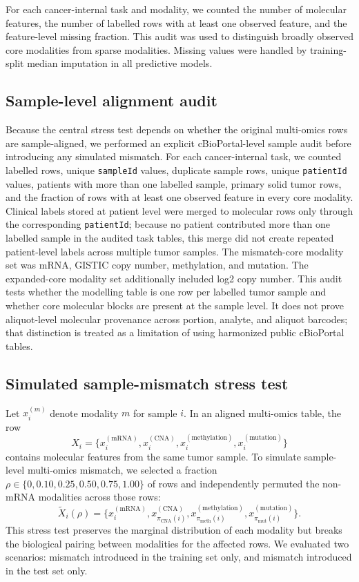 For each cancer-internal task and modality, we counted the number of molecular features, the number of labelled rows with at least one observed feature, and the feature-level missing fraction. This audit was used to distinguish broadly observed core modalities from sparse modalities. Missing values were handled by training-split median imputation in all predictive models.

\subsection{Sample-level alignment audit}

Because the central stress test depends on whether the original multi-omics rows are sample-aligned, we performed an explicit cBioPortal-level sample audit before introducing any simulated mismatch. For each cancer-internal task, we counted labelled rows, unique \texttt{sampleId} values, duplicate sample rows, unique \texttt{patientId} values, patients with more than one labelled sample, primary solid tumor rows, and the fraction of rows with at least one observed feature in every core modality. Clinical labels stored at patient level were merged to molecular rows only through the corresponding \texttt{patientId}; because no patient contributed more than one labelled sample in the audited task tables, this merge did not create repeated patient-level labels across multiple tumor samples. The mismatch-core modality set was mRNA, GISTIC copy number, methylation, and mutation. The expanded-core modality set additionally included log2 copy number. This audit tests whether the modelling table is one row per labelled tumor sample and whether core molecular blocks are present at the sample level. It does not prove aliquot-level molecular provenance across portion, analyte, and aliquot barcodes; that distinction is treated as a limitation of using harmonized public cBioPortal tables.

\subsection{Simulated sample-mismatch stress test}

Let \(x_i^{(m)}\) denote modality \(m\) for sample \(i\). In an aligned multi-omics table, the row
\[
X_i = \{x_i^{(\mathrm{mRNA})}, x_i^{(\mathrm{CNA})}, x_i^{(\mathrm{methylation})}, x_i^{(\mathrm{mutation})}\}
\]
contains molecular features from the same tumor sample. To simulate sample-level multi-omics mismatch, we selected a fraction \(\rho \in \{0, 0.10, 0.25, 0.50, 0.75, 1.00\}\) of rows and independently permuted the non-mRNA modalities across those rows:
\[
\tilde{X}_i(\rho)=\{x_i^{(\mathrm{mRNA})}, x_{\pi_{\mathrm{CNA}}(i)}^{(\mathrm{CNA})}, x_{\pi_{\mathrm{meth}}(i)}^{(\mathrm{methylation})}, x_{\pi_{\mathrm{mut}}(i)}^{(\mathrm{mutation})}\}.
\]
This stress test preserves the marginal distribution of each modality but breaks the biological pairing between modalities for the affected rows. We evaluated two scenarios: mismatch introduced in the training set only, and mismatch introduced in the test set only.

